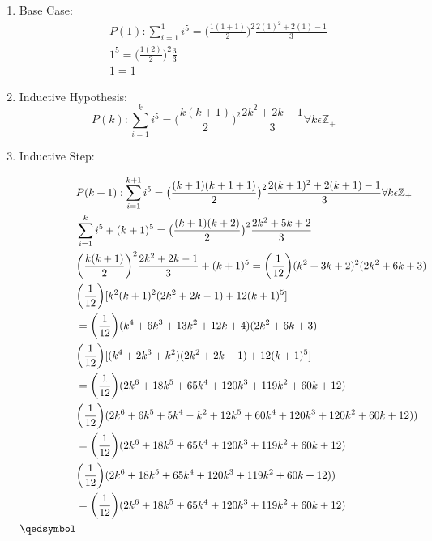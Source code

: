 \documentclass[12pt]{article}
\begin{document}
\begin{enumerate}
\item Base Case:\\
\begin{align}
&P(1):\sum\limits_{i = 1}^{1} i^5 = \big(\frac{1(1 + 1)}{2}\big)^2\frac{2(1)^2+2(1)-1}{3}\\
&1^5 = \big(\frac{1(2)}{2}\big)^2\frac{3}{3}\\
&1 = 1
\end{align}
\item Inductive Hypothesis:
\[P(k):\sum\limits_{i = 1}^{k} i^5 = \big(\frac{k(k + 1)}{2}\big)^2\frac{2k^2+2k-1}{3} \forall k \epsilon \mathbb{Z}_+  \]
\item Inductive Step:

\begin{align}
&P(k+1):\sum\limits_{i = 1}^{k+1} i^5 = \big(\frac{(k+1)(k + 1 + 1)}{2}\big)^2\frac{2(k+1)^2+2(k+1)-1}{3} \forall k \epsilon \mathbb{Z}_+ \\
&\sum\limits_{i = 1}^{k} i^5 + (k + 1)^5 = \big(\frac{(k+1)(k + 2)}{2}\big)^2\frac{2k^2+5k+2}{3}\\
&\bigg(\frac{k(k + 1)}{2}\bigg)^2\frac{2k^2+2k-1}{3} + (k + 1)^5 = \bigg(\frac{1}{12}\bigg)(k^2+3k+2)^2(2k^2+6k+3)\\
&\bigg(\frac{1}{12}\bigg)[k^2(k+1)^2(2k^2+2k-1)+12(k+1)^5]\\ 
&= \bigg(\frac{1}{12}\bigg)(k^4+6k^3+13k^2+12k+4)(2k^2+6k+3)\\
&\bigg(\frac{1}{12}\bigg)[(k^4+2k^3+k^2)(2k^2+2k-1)+12(k+1)^5]\\
&= \bigg(\frac{1}{12}\bigg)(2k^6+18k^5+65k^4+120k^3+119k^2+60k+12)\\
&\bigg(\frac{1}{12}\bigg)(2k^6+6k^5+5k^4-k^2+12k^5+60k^4+120k^3+120k^2+60k+12))\\
&= \bigg(\frac{1}{12}\bigg)(2k^6+18k^5+65k^4+120k^3+119k^2+60k+12)\\
&\bigg(\frac{1}{12}\bigg)(2k^6+18k^5+65k^4+120k^3+119k^2+60k+12))\\
&= \bigg(\frac{1}{12}\bigg)(2k^6+18k^5+65k^4+120k^3+119k^2+60k+12)\\
\qedsymbol
\end{align}
\end{enumerate}
\end{document}
